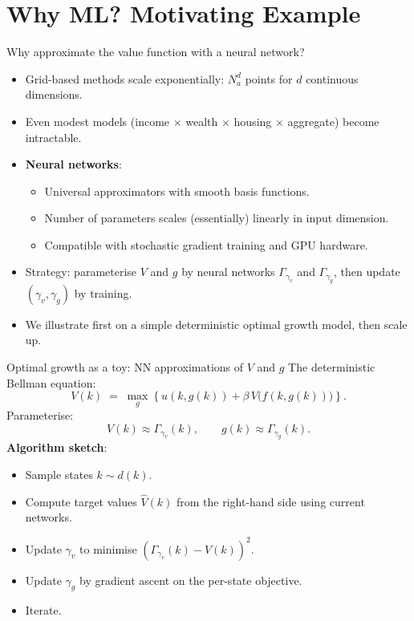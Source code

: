 \documentclass[10pt,english,aspectratio=169]{beamer}
\begin{document}
\section{Why ML? Motivating Example}

\begin{frame}{Why approximate the value function with a neural network?}
\begin{itemize}
\item Grid-based methods scale exponentially: $N_a^d$ points for $d$ continuous dimensions.
\medskip
\item Even modest models (income $\times$ wealth $\times$ housing $\times$ aggregate) become intractable.
\medskip
\item \textbf{Neural networks}:
  \begin{itemize}
  \item Universal approximators with smooth basis functions.
  \item Number of parameters scales (essentially) linearly in input dimension.
  \item Compatible with stochastic gradient training and GPU hardware.
  \end{itemize}
\medskip
\item Strategy: parameterise $V$ and $g$ by neural networks $\Gamma_{\gamma_v}$ and $\Gamma_{\gamma_g}$, then update $(\gamma_v,\gamma_g)$ by training.
\medskip
\item We illustrate first on a simple deterministic optimal growth model, then scale up.
\end{itemize}
\end{frame}

\begin{frame}{Optimal growth as a toy: NN approximations of $V$ and $g$}
The deterministic Bellman equation:
\[
V(k) \;=\; \max_{g}\!\left\{u(k,g(k)) + \beta\, V\!\big(f(k,g(k))\big)\right\}.
\]
\medskip
Parameterise:
\[
V(k) \approx \Gamma_{\gamma_v}(k), \qquad g(k) \approx \Gamma_{\gamma_g}(k).
\]
\medskip
\textbf{Algorithm sketch}:
\begin{itemize}
\item Sample states $k \sim d(k)$.
\item Compute target values $\hat V(k)$ from the right-hand side using current networks.
\item Update $\gamma_v$ to minimise $(\Gamma_{\gamma_v}(k) - \hat V(k))^2$.
\item Update $\gamma_g$ by gradient ascent on the per-state objective.
\item Iterate.
\end{itemize}
\end{frame}
\end{document}
